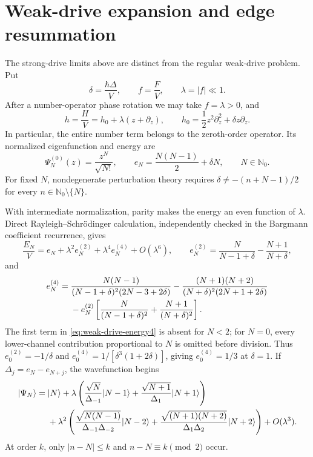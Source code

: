 \documentclass[11pt]{article}
\theoremstyle{remark}
\newcommand{\Nzero}{\mathbb{N}_{0}}
\begin{document}
\section{Weak-drive expansion and edge resummation}
\label{sec:weak-drive}

The strong-drive limits above are distinct from the regular weak-drive
problem.  Put
\begin{equation}
 \delta=\frac{\hbar\Delta}{V},\qquad f=\frac{F}{V},\qquad
 \lambda=|f|\ll1.
\end{equation}
After a number-operator phase rotation we may take $f=\lambda>0$, and
\begin{equation}
 h=\frac{H}{V}=h_0+\lambda(z+\partial_z),\qquad
 h_0=\frac{1}{2}z^2\partial_z^2+\delta z\partial_z .
 \label{eq:weak-drive-split}
\end{equation}
In particular, the entire number term belongs to the zeroth-order operator.
Its normalized eigenfunction and energy are
\begin{equation}
 \Psi_N^{(0)}(z)=\frac{z^N}{\sqrt{N!}},\qquad
 e_N=\frac{N(N-1)}{2}+\delta N,\qquad N\in\Nzero .
 \label{eq:weak-drive-zero}
\end{equation}
For fixed $N$, nondegenerate perturbation theory requires
$\delta\ne-(n+N-1)/2$ for every $n\in\Nzero\setminus\{N\}$.

With intermediate normalization, parity makes the energy an even function
of $\lambda$.  Direct Rayleigh--Schr\"odinger calculation, independently
checked in the Bargmann coefficient recurrence, gives
\begin{equation}
 \frac{E_N}{V}=e_N+\lambda^2 e_N^{(2)}+\lambda^4e_N^{(4)}+O(\lambda^6),
 \qquad
 e_N^{(2)}=\frac{N}{N-1+\delta}-\frac{N+1}{N+\delta},
 \label{eq:weak-drive-energy2}
\end{equation}
and
\begin{align}
e_N^{(4)}={}&\frac{N(N-1)}{(N-1+\delta)^2(2N-3+2\delta)}
-\frac{(N+1)(N+2)}{(N+\delta)^2(2N+1+2\delta)}\notag\\
&-e_N^{(2)}\left[\frac{N}{(N-1+\delta)^2}
+\frac{N+1}{(N+\delta)^2}\right].
\label{eq:weak-drive-energy4}
\end{align}
The first term in \eqref{eq:weak-drive-energy4} is absent for $N<2$; for
$N=0$, every lower-channel contribution proportional to $N$ is omitted
before division.  Thus $e_0^{(2)}=-1/\delta$ and
$e_0^{(4)}=1/[\delta^3(1+2\delta)]$, giving $e_0^{(4)}=1/3$ at $\delta=1$.
If
$\Delta_j=e_N-e_{N+j}$, the wavefunction begins
\begin{align}
|\Psi_N\rangle={}&|N\rangle+\lambda\left(
 \frac{\sqrt N}{\Delta_{-1}}|N-1\rangle
 +\frac{\sqrt{N+1}}{\Delta_1}|N+1\rangle\right)\notag\\
&+\lambda^2\left(
 \frac{\sqrt{N(N-1)}}{\Delta_{-1}\Delta_{-2}}|N-2\rangle
 +\frac{\sqrt{(N+1)(N+2)}}{\Delta_1\Delta_2}|N+2\rangle\right)
 +O(\lambda^3).
\label{eq:weak-drive-wavefunction}
\end{align}
At order $k$, only $|n-N|\le k$ and $n-N\equiv k\pmod2$ occur.
\end{document}
